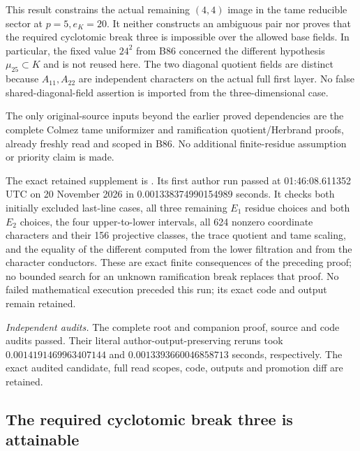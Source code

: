 \begin{remark}
\label{rem:B-RD88-scope}
This result constrains the actual remaining \((4,4)\)
image in the tame reducible sector at \(p=5,e_K=20\).
It neither constructs an ambiguous pair nor proves that
the required cyclotomic break three is impossible over
the allowed base fields. In particular, the fixed value
\(24^2\) from B86 concerned the different hypothesis
\(\mu_{25}\subset K\) and is not reused here.
The two diagonal quotient fields are distinct because
\(A_{11},A_{22}\) are independent characters on the
actual full first layer. No false shared-diagonal-field
assertion is imported from the three-dimensional case.

The only original-source inputs beyond the earlier
proved dependencies are the complete Colmez tame
uniformizer and ramification quotient/Herbrand proofs,
already freshly read and scoped in B86. No additional
finite-residue assumption or priority claim is made.

The exact retained supplement is
.
Its first author run passed at 01:46:08.611352 UTC
on 20 November 2026 in 0.001338374990154989 seconds.
It checks both initially excluded last-line cases,
all three remaining \(E_1\) residue choices and both
\(E_2\) choices, the four upper-to-lower intervals,
all 624 nonzero coordinate characters and their
156 projective classes, the trace quotient and tame
scaling, and the equality of the different computed
from the lower filtration and from the character
conductors. These are exact finite consequences of
the preceding proof; no bounded search for an
unknown ramification break replaces that proof.
No failed mathematical execution preceded this run;
its exact code and output remain retained.

\smallskip
\noindent\emph{Independent audits.}
The complete root and companion proof, source and code audits passed.
Their literal author-output-preserving reruns took
\(0.0014191469963407144\) and
\(0.0013393660046858713\) seconds, respectively.
The exact audited candidate, full read scopes, code,
outputs and promotion diff are retained.
\end{remark}


\subsection{The required cyclotomic break three is attainable}

